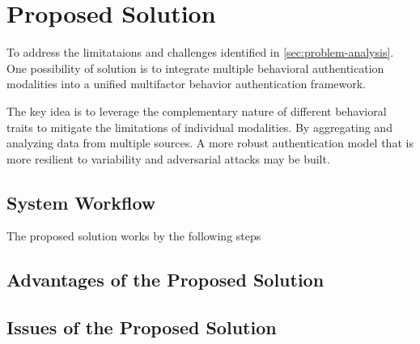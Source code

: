 \section{Proposed Solution}

To address the limitataions and challenges identified in \ref{sec:problem-analysis}. One possibility of solution is to integrate multiple behavioral authentication modalities into a unified multifactor behavior authentication framework.

The key idea is to leverage the complementary nature of different behavioral traits to mitigate the limitations of individual modalities. By aggregating and analyzing data from multiple sources. A more robust authentication model that is more resilient to variability and adversarial attacks may be built.

\subsection{System Workflow}
The proposed solution works by the following steps

\subsection{Advantages of the Proposed Solution}

\subsection{Issues of the Proposed Solution}
